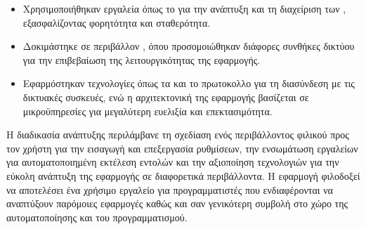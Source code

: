 \begin{itemize}
    \item Χρησιμοποιήθηκαν εργαλεία όπως το  για την ανάπτυξη και τη διαχείριση των , εξασφαλίζοντας φορητότητα και σταθερότητα.
    \item Δοκιμάστηκε σε περιβάλλον , όπου προσομοιώθηκαν διάφορες συνθήκες δικτύου για την επιβεβαίωση της λειτουργικότητας της εφαρμογής.
    \item Εφαρμόστηκαν τεχνολογίες όπως τα  και το  πρωτοκολλο για τη διασύνδεση με τις δικτυακές συσκευές, ενώ η αρχιτεκτονική της εφαρμογής βασίζεται σε μικροϋπηρεσίες για μεγαλύτερη ευελιξία και επεκτασιμότητα.
\end{itemize}

Η διαδικασία ανάπτυξης περιλάμβανε τη σχεδίαση ενός περιβάλλοντος φιλικού προς τον χρήστη για την εισαγωγή και επεξεργασία ρυθμίσεων, την ενσωμάτωση εργαλείων για αυτοματοποιημένη εκτέλεση εντολών και την αξιοποίηση τεχνολογιών  για την εύκολη ανάπτυξη της εφαρμογής σε διαφορετικά περιβάλλοντα.
Η εφαρμογή φιλοδοξεί να αποτελέσει ένα χρήσιμο εργαλείο για προγραμματιστές που ενδιαφέρονται να αναπτύξουν παρόμοιες εφαρμογές καθώς και σαν γενικότερη συμβολή στο χώρο της αυτοματοποίησης και του προγραμματισμού.